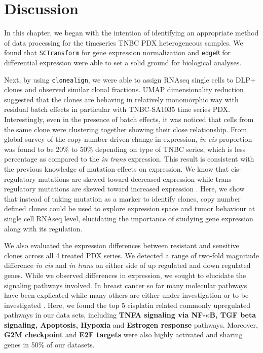 

\section{Discussion}

In this chapter, we began with the intention of identifying an appropriate method of data processing for the timeseries TNBC PDX heterogeneous samples. We found that \texttt{SCTransform} for gene expression normalization and \texttt{edgeR} for differential expression were able to set a solid ground for biological analyses. 

Next, by using \texttt{clonealign}, we were able to assign RNAseq single cells  to  DLP+ clones and observed similar clonal fractions. \ac{UMAP} dimensionality reduction suggested that the clones are behaving in relatively monomorphic way with residual batch effects in particular with TNBC-SA1035 time series PDX. Interestingly, even in the presence of batch effects, it was noticed that cells from the same clone were clustering together showing their close relationship.
From global survey of the copy number driven change in expression, \textit{in cis} proportion was found to be 20\% to 50\% depending on type of TNBC series, which is less percentage as compared to the \textit{in trans} expression. 
This result is consistent with the previous knowledge of mutation effects on expression. We know that cis-regulatory mutations are skewed toward decreased expression while trans-regulatory mutations are skewed toward increased expression \cite{metzger2016contrasting}. Here, we show that instead of taking mutation as a marker to identify clones, copy number defined clones could be used to explore expression  space and tumor behaviour at single cell RNAseq level, elucidating the importance of studying gene expression along with its regulation.

We also evaluated the expression differences between resistant and sensitive clones across all 4 treated PDX series. We detected a range of two-fold magnitude difference \textit{in cis} and \textit{in trans} on either side of up regulated and down regulated genes. While we observed differences in expression, we sought to elucidate the signaling pathways involved. In breast cancer so far many molecular pathways have been explicated while many others are either under investigation or to be investigated \cite{hanahan2011hallmarks}. Here, we found the top 5 cisplatin related commonly upregulated pathways in our data sets, including \textbf{TNFA signaling via NF-$\kappa$B, TGF  beta  signaling, Apoptosis, Hypoxia} and \textbf{Estrogen response} pathways. Moreover, \textbf{G2M checkpoint} and \textbf{E2F targets} were also highly activated and sharing genes in 50\% of our datasets. 

